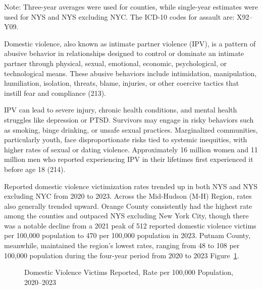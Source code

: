 \documentclass[
  english,
  letterpaper,
]{report}
\begin{document}
\begin{tcolorbox}[enhanced jigsaw, breakable, leftrule=.75mm, title=\textcolor{quarto-callout-note-color}{\faInfo}\hspace{0.5em}{Note}, bottomrule=.15mm, opacityback=0, left=2mm, colback=white, bottomtitle=1mm, coltitle=black, colbacktitle=quarto-callout-note-color!10!white, colframe=quarto-callout-note-color-frame, opacitybacktitle=0.6, toptitle=1mm, titlerule=0mm, arc=.35mm, rightrule=.15mm, toprule=.15mm]

Note: Three-year averages were used for counties, while single-year
estimates were used for NYS and NYS excluding NYC. The ICD-10 codes for
assault are: X92--Y09.

\end{tcolorbox}

Domestic violence, also known as intimate partner violence (IPV), is a
pattern of abusive behavior in relationships designed to control or
dominate an intimate partner through physical, sexual, emotional,
economic, psychological, or technological means. These abusive behaviors
include intimidation, manipulation, humiliation, isolation, threats,
blame, injuries, or other coercive tactics that instill fear and
compliance (213).

IPV can lead to severe injury, chronic health conditions, and mental
health struggles like depression or PTSD. Survivors may engage in risky
behaviors such as smoking, binge drinking, or unsafe sexual practices.
Marginalized communities, particularly youth, face disproportionate
risks tied to systemic inequities, with higher rates of sexual or dating
violence. Approximately 16 million women and 11 million men who reported
experiencing IPV in their lifetimes first experienced it before age 18
(214).

Reported domestic violence victimization rates trended up in both NYS
and NYS excluding NYC from 2020 to 2023. Across the Mid-Hudson (M-H)
Region, rates also generally trended upward. Orange County consistently
had the highest rate among the counties and outpaced NYS excluding New
York City, though there was a notable decline from a 2021 peak of 512
reported domestic violence victims per 100,000 population to 470 per
100,000 population in 2023. Putnam County, meanwhile, maintained the
region's lowest rates, ranging from 48 to 108 per 100,000 population
during the four-year period from 2020 to 2023
Figure~\ref{fig-dv-victim-rate}.

\begin{figure}


\caption{\label{fig-dv-victim-rate}Domestic Violence Victims Reported,
Rate per 100,000 Population, 2020--2023}

\end{figure}%
\end{document}
